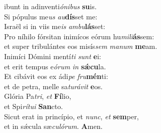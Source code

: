 \oddverse ibunt in adinventi\textit{ó}\textit{ni}\textit{bus} \textbf{su}is.\\
\evenverse Si pópulus me\textit{us} \textit{au}\textbf{dís}set me:~\*\\
\evenverse Israël si in viis me\textit{is} \textit{am}\textit{bu}\textbf{lás}set:\\
\oddverse Pro níhilo fórsitan inimícos eórum hu\textit{mi}\textit{li}\textbf{ás}sem:~\*\\
\oddverse et super tribulántes eos misís\textit{sem} \textit{ma}\textit{num} \textbf{me}am.\\
\evenverse Inimíci Dómini mentí\textit{ti} \textit{sunt} \textbf{e}i:~\*\\
\evenverse et erit tempus e\textit{ó}\textit{rum} \textit{in} \textbf{sǽ}\textbf{cu}la.\\
\oddverse Et cibávit eos ex ádi\textit{pe} \textit{fru}\textbf{mén}ti:~\*\\
\oddverse et de petra, melle sa\textit{tu}\textit{rá}\textit{vit} \textbf{e}os.\\
\evenverse Glória Pa\textit{tri}, \textit{et} \textbf{Fí}lio,~\*\\
\evenverse et Spi\textit{rí}\textit{tu}\textit{i} \textbf{San}cto.\\
\oddverse Sicut erat in princípio, et \textit{nunc}, \textit{et} \textbf{sem}per,~\*\\
\oddverse et in sǽcula sæ\textit{cu}\textit{ló}\textit{rum}. \textbf{A}men.\\
